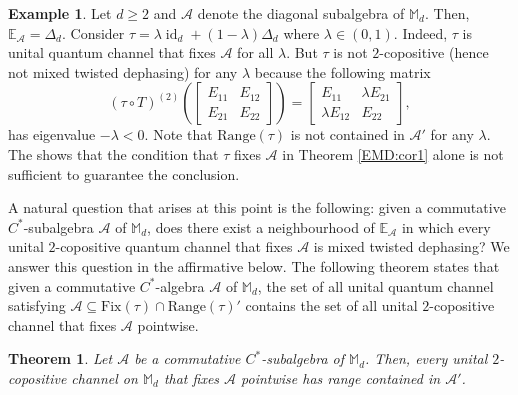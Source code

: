 \documentclass[11pt,reqno]{amsart}
\theoremstyle{definition}
\newtheorem{eg}[defn]{Example}
\theoremstyle{plain}
\newtheorem{thm}[defn]{Theorem}
\theoremstyle{remark}
\numberwithin{equation}{section}%
\begin{document}
  
  \begin{eg}\label{example in a nbd of expectation}
  	Let $d\ge2$ and $\mathcal{A}$ denote the diagonal subalgebra of $\mathbb{M}_d$. Then, $\mathbb{E}_{\mathcal{A}}=\Delta_d$. Consider $\tau=\lambda \operatorname{id}_d+(1-\lambda)\Delta_d$ where $\lambda\in(0,1)$. Indeed, $\tau$ is unital quantum channel that fixes $\mathcal{A}$ for all $\lambda$. But $\tau$ is not $2$-copositive (hence not mixed twisted dephasing) for any $\lambda$ because the following matrix \[(\tau\circ T)^{(2)}\left(\begin{bmatrix}
  		E_{11} & E_{12}\\ E_{21} & E_{22}
  	\end{bmatrix}\right)=\begin{bmatrix}
  		E_{11} & \lambda E_{21}\\ \lambda E_{12} & E_{22}
  	\end{bmatrix},\]
  	has eigenvalue $-\lambda<0$. Note that $\text{Range}(\tau)$ is not contained in $\mathcal{A}'$ for any $\lambda$. The shows that the condition that $\tau$ fixes $\mathcal{A}$ in Theorem \ref{EMD:cor1} alone is not sufficient to guarantee the conclusion. 
  \end{eg}
  
  
  A natural question that arises at this point is the following: given a commutative $C^*$-subalgebra $\mathcal{A}$ of $\mathbb{M}_d$, does there exist a neighbourhood of $\mathbb{E}_{\mathcal{A}}$ in which every unital $2$-copositive quantum channel that fixes $\mathcal{A}$ is mixed twisted dephasing? We answer this question in the affirmative below. The following theorem states that given a commutative $C^*$-algebra $\mathcal{A}$ of $\mathbb{M}_d$, the set of all unital quantum channel satisfying $\mathcal{A}\subseteq\text{Fix}(\tau)\cap\text{Range}(\tau)'$ contains the set of all unital $2$-copositive channel that fixes $\mathcal{A}$ pointwise.
 
 
 \begin{thm}\label{EMD:prop1}
 	Let $\mathcal{A}$ be a commutative $C^*$-subalgebra of $\mathbb{M}_d$. Then, every unital $2$-copositive channel on $\mathbb{M}_d$ that fixes $\mathcal{A}$ pointwise has range contained in $\mathcal{A}'$.
 \end{thm}
 
\end{document}
